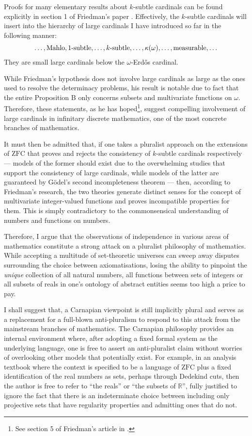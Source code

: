 \documentclass[12pt]{article}
\theoremstyle{plain}
\theoremstyle{definition}
\newcommand{\ZFC}{\mathrm{ZFC}}
\begin{document}
Proofs for many elementary results about $k$-subtle cardinals can be found explicitly in section 1 of Friedman's paper \cite{subtle-cardinals}. Effectively, the $k$-subtle cardinals will insert into the hierarchy of large cardinals I have introduced so far in the following manner:
\[\ldots, \text{Mahlo}, \text{$1$-subtle}, \ldots, \text{$k$-subtle}, \ldots, \kappa\mleft(\omega\mright), \ldots, \text{measurable}, \ldots\]
They are small large cardinals below the $\omega$-Erd\H{o}s cardinal.

While Friedman's hypothesis does not involve large cardinals as large as the ones used to resolve the determinacy problems, his result is notable due to fact that the entire Proposition B only concerns subsets and multivariate functions on $\omega$. Therefore, these statements, as he has hoped\footnote{See section 5 of Friedman's article in \cite{new-axioms-panel}.}, suggest compelling involvement of large cardinals in infinitary discrete mathematics, one of the most concrete branches of mathematics.

It must then be admitted that, if one takes a pluralist approach on the extensions of $\ZFC$ that proves and rejects the consistency of $k$-subtle cardinals respectively --- models of the former should exist due to the overwhelming studies that support the consistency of large cardinals, while models of the latter are guaranteed by G\"odel's second incompleteness theorem --- then, according to Friedman's research, the two theories generate distinct senses for the concept of multivariate integer-valued functions and proves incompatible properties for them. This is simply contradictory to the commonsensical understanding of numbers and functions on numbers.

Therefore, I argue that the observations of independence in various areas of mathematics constitute a strong attack on a pluralist philosophy of mathematics. While accepting a multitude of set-theoretic universes can sweep away disputes surrounding the choice between axiomatisations, losing the ability to pinpoint the \emph{unique} collection of all natural numbers, all functions between sets of integers or all subsets of reals in one's ontology of abstract entities seems too high a price to pay.

I shall suggest that, a Carnapian viewpoint is still implicitly plural and serves as a replacement for a full-blown anti-pluralism to respond to this attack from the mainstream branches of mathematics. The Carnapian philosophy provides an internal environment where, after adopting a fixed formal system as the underlying language, one is free to assert an anti-pluralist claim without worries of overlooking other models that potentially exist. For example, in an analysis textbook where the context is specified to be a language of $\ZFC$ plus a fixed identification of the real numbers as sets, perhaps through Dedekind cuts, then the author is free to refer to ``the reals'' or ``the subsets of $\mathbb{R}$'', fully justified to ignore the fact that there is an indeterminate choice between including only projective sets that have regularity properties and admitting ones that do not.
\end{document}
